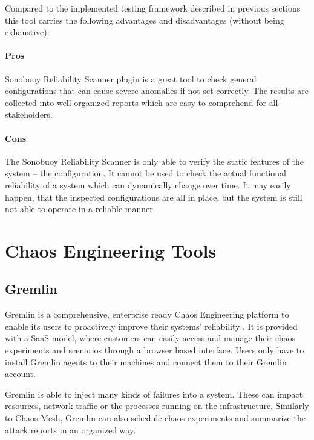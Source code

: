 Compared to the implemented testing framework described in previous sections this tool carries the following advantages and disadvantages (without being exhaustive):

\paragraph{Pros} Sonobuoy Reliability Scanner plugin is a great tool to check general configurations that can cause severe anomalies if not set correctly. The results are collected into well organized reports which are easy to comprehend for all stakeholders.

\paragraph{Cons} The Sonobuoy Reliability Scanner is only able to verify the static features of the system -- the configuration. It cannot be used to check the actual functional reliability of a system which can dynamically change over time. It may easily happen, that the inspected configurations are all in place, but the system is still not able to operate in a reliable manner.

\section{Chaos Engineering Tools}

\subsection{Gremlin}

Gremlin is a comprehensive, enterprise ready Chaos Engineering platform to enable its users to proactively improve their systems' reliability \cite{Gremlin}. It is provided with a SaaS model, where customers can easily access and manage their chaos experiments and scenarios through a browser based interface. Users only have to install Gremlin agents to their machines and connect them to their Gremlin account.

Gremlin is able to inject many kinds of failures into a system. These can impact resources, network traffic or the processes running on the infrastructure. Similarly to Chaos Mesh, Gremlin can also schedule chaos experiments and summarize the attack reports in an organized way.

